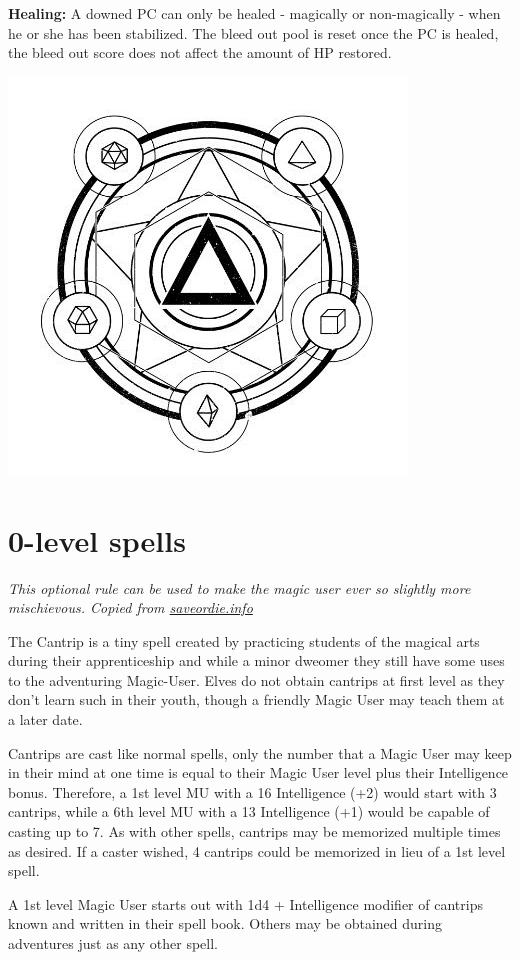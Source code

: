 \documentclass[letterpaper,sansserif,tightsqueeze]{rpg-module}
\begin{document}
\textbf{Healing:} A downed PC can only be healed - magically or non-magically - when he or she has been stabilized. The bleed out pool is reset once the PC is healed, the bleed out score does not affect the amount of HP restored.\\

\begin{center}
	\includegraphics[width = 0.4\linewidth]{cantrip_logo.jpg}
\end{center}
\section{0-level spells}
\textit{This optional rule can be used to make the magic user ever so slightly more mischievous. Copied from \href{http://saveordie.info/?p=90}{saveordie.info}}

The Cantrip is a tiny spell created by practicing students of the magical arts during their apprenticeship and while a minor dweomer they still have some uses to the adventuring Magic-User. Elves do not obtain cantrips at first level as they don’t learn such in their youth, though a friendly Magic User may teach them at a later date.

Cantrips are cast like normal spells, only the number that a Magic User may keep in their mind at one time is equal to their Magic User level plus their Intelligence bonus. Therefore, a 1st level MU with a 16 Intelligence (+2) would start with 3 cantrips, while a 6th level MU with a 13 Intelligence (+1) would be capable of casting up to 7. As with other spells, cantrips may be memorized multiple times as desired. If a caster wished, 4 cantrips could be memorized in lieu of a 1st level spell.

A 1st level Magic User starts out with 1d4 + Intelligence modifier of cantrips known and written in their spell book. Others may be obtained during adventures just as any other spell.\\
\end{document}
